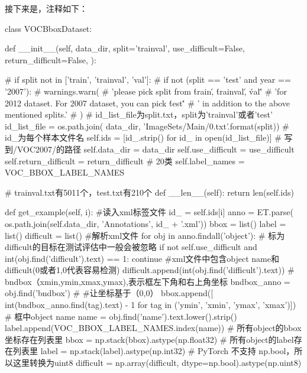 \documentclass{article}
\begin{document}
接下来是，注释如下：


\begin{langbox}[Python]
class VOCBboxDataset:
    
    def __init__(self, data_dir, split='trainval',
                 use_difficult=False, return_difficult=False,
                 ):

        # if split not in ['train', 'trainval', 'val']:
        #     if not (split == 'test' and year == '2007'):
        #         warnings.warn(
        #             'please pick split from \'train\', \'trainval\', \'val\''
        #             'for 2012 dataset. For 2007 dataset, you can pick \'test\''
        #             ' in addition to the above mentioned splits.'
        #         )
        # id_list_file为split.txt，split为'trainval'或者'test'
        id_list_file = os.path.join(
            data_dir, 'ImageSets/Main/{0}.txt'.format(split))
        # id_为每个样本文件名
        self.ids = [id_.strip() for id_ in open(id_list_file)]
        # 写到/VOC2007/的路径
        self.data_dir = data_dir
        self.use_difficult = use_difficult
        self.return_difficult = return_difficult
        # 20类
        self.label_names = VOC_BBOX_LABEL_NAMES

    # trainval.txt有5011个，test.txt有210个
    def __len__(self):
        return len(self.ids)

    def get_example(self, i):
        #读入xml标签文件
        id_ = self.ids[i]
        anno = ET.parse(
            os.path.join(self.data_dir, 'Annotations', id_ + '.xml'))
        bbox = list()
        label = list()
        difficult = list()
        #解析xml文件
        for obj in anno.findall('object'):
            # 标为difficult的目标在测试评估中一般会被忽略
            if not self.use_difficult and int(obj.find('difficult').text) == 1:
                continue
            #xml文件中包含object name和difficult(0或者1,0代表容易检测)
            difficult.append(int(obj.find('difficult').text))
            # bndbox（xmin,ymin,xmax,ymax),表示框左下角和右上角坐标
            bndbox_anno = obj.find('bndbox')
            # #让坐标基于（0,0）
            bbox.append([
                int(bndbox_anno.find(tag).text) - 1
                for tag in ('ymin', 'xmin', 'ymax', 'xmax')])
            # 框中object name
            name = obj.find('name').text.lower().strip()
            label.append(VOC_BBOX_LABEL_NAMES.index(name))
        # 所有object的bbox坐标存在列表里
        bbox = np.stack(bbox).astype(np.float32)
        # 所有object的label存在列表里
        label = np.stack(label).astype(np.int32)
        # PyTorch 不支持 np.bool，所以这里转换为uint8
        difficult = np.array(difficult, dtype=np.bool).astype(np.uint8)  


\end{langbox}
\end{document}
